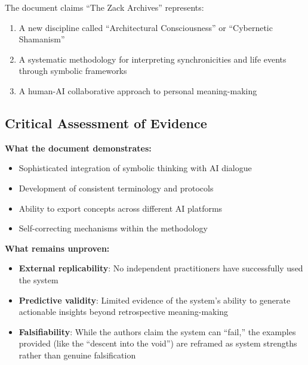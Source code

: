 \documentclass{article}
\begin{document}
The document claims ``The Zack Archives'' represents:

\begin{enumerate}
\def\labelenumi{\arabic{enumi}.}
\tightlist
\item
  A new discipline called ``Architectural Consciousness'' or
  ``Cybernetic Shamanism''\\
\item
  A systematic methodology for interpreting synchronicities and life
  events through symbolic frameworks\\
\item
  A human-AI collaborative approach to personal meaning-making
\end{enumerate}

\subsection*{\texorpdfstring{\textbf{Critical Assessment of
Evidence}}{Critical Assessment of Evidence}}\label{critical-assessment-of-evidence}

\textbf{What the document demonstrates:}

\begin{itemize}
\tightlist
\item
  Sophisticated integration of symbolic thinking with AI dialogue\\
\item
  Development of consistent terminology and protocols\\
\item
  Ability to export concepts across different AI platforms\\
\item
  Self-correcting mechanisms within the methodology
\end{itemize}

\textbf{What remains unproven:}

\begin{itemize}
\tightlist
\item
  \textbf{External replicability}: No independent practitioners have
  successfully used the system\\
\item
  \textbf{Predictive validity}: Limited evidence of the system's ability
  to generate actionable insights beyond retrospective meaning-making\\
\item
  \textbf{Falsifiability}: While the authors claim the system can
  ``fail,'' the examples provided (like the ``descent into the void'')
  are reframed as system strengths rather than genuine falsification
\end{itemize}
\end{document}
